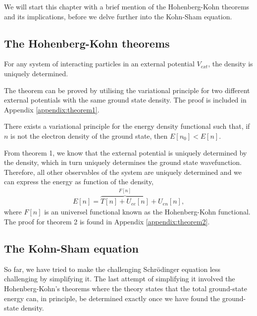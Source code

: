We will start this chapter with a brief mention of the Hohenberg-Kohn theorems and its implications, before we delve further into the Kohn-Sham equation.

\subsection{The Hohenberg-Kohn theorems}

\begin{theorem}
  For any system of interacting particles in an external potential $V_{ext}$, the density is uniquely determined.
\end{theorem}

The theorem can be proved by utilising the variational principle for two different external potentials with the same ground state density.
The proof is included in Appendix \ref{appendix:theorem1}.

\begin{theorem}
  There exists a variational principle for the energy density functional such that, if $n$ is not the electron density of the ground state, then $E\left[ n_0 \right] < E\left[ n \right]$.
\end{theorem}

From theorem 1, we know that the external potential is uniquely determined by the density, which in turn uniquely determines the ground state wavefunction. Therefore, all other observables of the system are uniquely determined and we can express the energy as function of the density,
\begin{align}
  E[n] = \overbrace{T[n] + U_{ee}[n]}^{F[n]} + U_{en}[n],
  \label{eq:densityfunctional}
\end{align}
where $F[n]$ is an universel functional known as the Hohenberg-Kohn functional. The proof for theorem 2 is found in Appendix \ref{appendix:theorem2}.

\subsection{The Kohn-Sham equation}
So far, we have tried to make the challenging Schrödinger equation less challenging by simplifying it. The last attempt of simplifying it involved the Hohenberg-Kohn's theorems where the theory states that the total ground-state energy can, in principle, be determined exactly once we have found the ground-state density.

